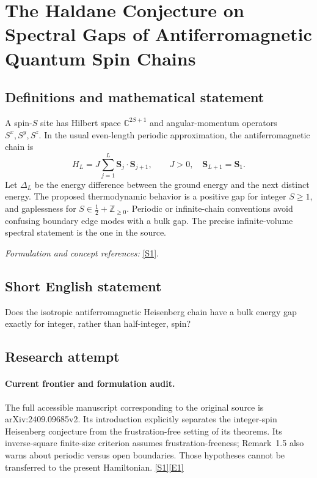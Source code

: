 \documentclass[11pt,a4paper]{article}
\newcommand{\Z}{\mathbb{Z}}
\newcommand{\C}{\mathbb{C}}
\newcommand{\sref}[2]{\hyperlink{source:#1:#2}{[S#2]}}
\newcommand{\eref}[2]{\hyperlink{extra:#1:#2}{[E#2]}}
\newif\ifshowcatalogue
\newcommand{\cataloguescope}[1]{\ifshowcatalogue
 \paragraph{Exact scope in the supplied catalogue.}
 \begin{quote}\small #1\end{quote}\fi}
\numberwithin{equation}{section}
\begin{document}
\setcounter{section}{0}
\clearpage
\section*{\texorpdfstring{The Haldane Conjecture on Spectral Gaps of Antiferromagnetic Quantum Spin Chains}{The Haldane Conjecture on Spectral Gaps of Antiferromagnetic Quantum Spin Chains}}\label{30006733}
\subsection{Definitions and mathematical statement}
A spin-$S$ site has Hilbert space $\C^{2S+1}$ and angular-momentum operators $S^x,S^y,S^z$. In the usual even-length periodic approximation, the antiferromagnetic chain is
\[
 H_L=J\sum_{j=1}^{L}\mathbf S_j\cdot\mathbf S_{j+1},\qquad J>0,\quad\mathbf S_{L+1}=\mathbf S_1.
\]
Let $\Delta_L$ be the energy difference between the ground energy and the next distinct energy. The proposed thermodynamic behavior is a positive gap for integer $S\ge1$, and gaplessness for $S\in\tfrac12+\Z_{\ge0}$. Periodic or infinite-chain conventions avoid confusing boundary edge modes with a bulk gap. The precise infinite-volume spectral statement is the one in the source.
\par\smallskip\textit{Formulation and concept references:} \sref{30006733}{1}.
\cataloguescope{Prove that the one-dimensional isotropic antiferromagnetic Heisenberg chain has a positive spectral gap for every integer spin S >= 1 and is gapless for every half-integer spin.}
\subsection{Short English statement}
Does the isotropic antiferromagnetic Heisenberg chain have a bulk energy gap exactly for integer, rather than half-integer, spin?
\subsection{Research attempt}

\paragraph{Current frontier and formulation audit.}
The full accessible manuscript corresponding to the original source is
arXiv:2409.09685v2. Its introduction explicitly separates the integer-spin
Heisenberg conjecture from the frustration-free setting of its theorems.
Its inverse-square finite-size criterion assumes frustration-freeness;
Remark~1.5 also warns about periodic versus open boundaries. Those hypotheses
cannot be transferred to the present Hamiltonian. \sref{30006733}{1}\eref{30006733}{1}
\end{document}
